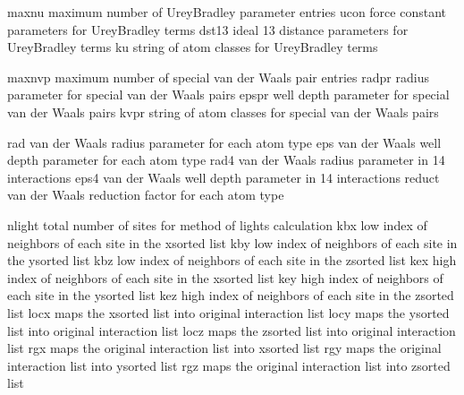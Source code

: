 \documentclass[letterpaper,11pt,english]{sphinxmanual}
\begin{document}

\begin{sphinxVerbatim}[commandchars=\\\{\}]
maxnu           maximum number of Urey\PYGZhy{}Bradley parameter entries
ucon            force constant parameters for Urey\PYGZhy{}Bradley terms
dst13           ideal 1\PYGZhy{}3 distance parameters for Urey\PYGZhy{}Bradley terms
ku              string of atom classes for Urey\PYGZhy{}Bradley terms
\end{sphinxVerbatim}


\begin{sphinxVerbatim}[commandchars=\\\{\}]
maxnvp          maximum number of special van der Waals pair entries
radpr           radius parameter for special van der Waals pairs
epspr           well depth parameter for special van der Waals pairs
kvpr            string of atom classes for special van der Waals pairs
\end{sphinxVerbatim}


\begin{sphinxVerbatim}[commandchars=\\\{\}]
rad             van der Waals radius parameter for each atom type
eps             van der Waals well depth parameter for each atom type
rad4            van der Waals radius parameter in 1\PYGZhy{}4 interactions
eps4            van der Waals well depth parameter in 1\PYGZhy{}4 interactions
reduct          van der Waals reduction factor for each atom type
\end{sphinxVerbatim}


\begin{sphinxVerbatim}[commandchars=\\\{\}]
nlight          total number of sites for method of lights calculation
kbx             low index of neighbors of each site in the x\PYGZhy{}sorted list
kby             low index of neighbors of each site in the y\PYGZhy{}sorted list
kbz             low index of neighbors of each site in the z\PYGZhy{}sorted list
kex             high index of neighbors of each site in the x\PYGZhy{}sorted list
key             high index of neighbors of each site in the y\PYGZhy{}sorted list
kez             high index of neighbors of each site in the z\PYGZhy{}sorted list
locx            maps the x\PYGZhy{}sorted list into original interaction list
locy            maps the y\PYGZhy{}sorted list into original interaction list
locz            maps the z\PYGZhy{}sorted list into original interaction list
rgx             maps the original interaction list into x\PYGZhy{}sorted list
rgy             maps the original interaction list into y\PYGZhy{}sorted list
rgz             maps the original interaction list into z\PYGZhy{}sorted list
\end{sphinxVerbatim}
\end{document}
